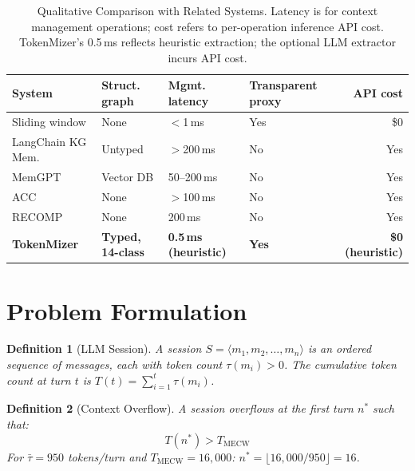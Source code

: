 \documentclass[journal]{IEEEtran}
\newtheorem{definition}{Definition}
\begin{document}
\begin{table}[t]
  \centering
  \caption{Qualitative Comparison with Related Systems.
  Latency is for context management operations; cost refers
  to per-operation inference API cost. TokenMizer's 0.5\,ms
  reflects heuristic extraction; the optional LLM extractor
  incurs API cost.}
  \label{tab:related}
  \renewcommand{\arraystretch}{1.25}
  \begin{tabular}{@{}lp{1.2cm}p{1.1cm}p{1.1cm}r@{}}
    \toprule
    \textbf{System} & \textbf{Struct. graph} &
    \textbf{Mgmt. latency} &
    \textbf{Transparent proxy} & \textbf{API cost} \\
    \midrule
    Sliding window      & None      & $<$1\,ms   & Yes & \$0  \\
    LangChain KG Mem.   & Untyped   & $>$200\,ms & No  & Yes  \\
    MemGPT              & Vector DB & 50--200\,ms& No  & Yes  \\
    ACC                 & None      & $>$100\,ms & No  & Yes  \\
    RECOMP              & None      & 200\,ms    & No  & Yes  \\
    \rowcolor{rowours}
    \textbf{TokenMizer}
      & \textbf{Typed, 14-class} & \textbf{0.5\,ms (heuristic)}
      & \textbf{Yes}   & \textbf{\$0 (heuristic)} \\
    \bottomrule
  \end{tabular}
\end{table}

\section{Problem Formulation}
\label{sec:problem}

\begin{definition}[LLM Session]
A session $S = \langle m_1, m_2, \ldots, m_n \rangle$ is an
ordered sequence of messages, each with token count
$\tau(m_i) > 0$. The cumulative token count at turn $t$ is
$T(t) = \sum_{i=1}^{t} \tau(m_i)$.
\end{definition}

\begin{definition}[Context Overflow]
A session overflows at the first turn $n^*$ such that:
\begin{equation}
  T(n^*) > T_{\mathrm{MECW}}
  \label{eq:overflow}
\end{equation}
For $\bar{\tau} = 950$ tokens/turn and
$T_{\mathrm{MECW}} = 16{,}000$:
$n^* = \lfloor 16{,}000 / 950 \rfloor = 16$.
\end{definition}
\end{document}
